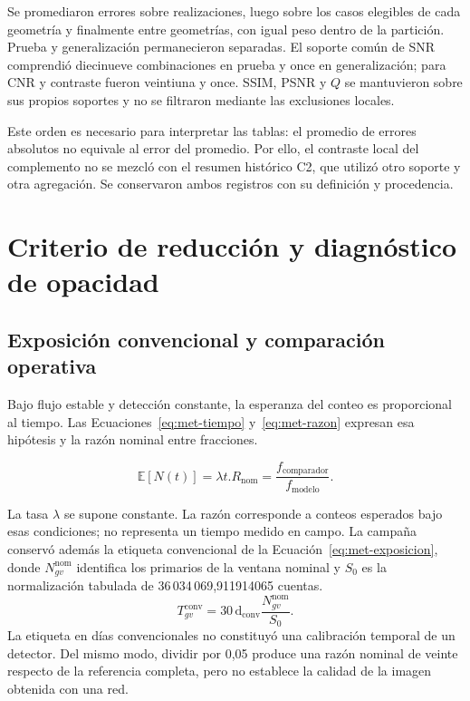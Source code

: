 Se promediaron errores sobre realizaciones, luego sobre los casos elegibles de cada geometría y finalmente entre geometrías, con igual peso dentro de la partición. Prueba y generalización permanecieron separadas. El soporte común de SNR comprendió diecinueve combinaciones en prueba y once en generalización; para CNR y contraste fueron veintiuna y once. SSIM, PSNR y $Q$ se mantuvieron sobre sus propios soportes y no se filtraron mediante las exclusiones locales.

Este orden es necesario para interpretar las tablas: el promedio de errores absolutos no equivale al error del promedio. Por ello, el contraste local del complemento no se mezcló con el resumen histórico C2, que utilizó otro soporte y otra agregación. Se conservaron ambos registros con su definición y procedencia.

\section{Criterio de reducción y diagnóstico de opacidad}\label{sec:met-factor}
\subsection{Exposición convencional y comparación operativa}
Bajo flujo estable y detección constante, la esperanza del conteo es proporcional al tiempo. Las Ecuaciones~\eqref{eq:met-tiempo} y~\eqref{eq:met-razon} expresan esa hipótesis y la razón nominal entre fracciones.
\begin{samepage}\begin{subequations}
\begin{equation}\mathbb E[N(t)]=\lambda t.\label{eq:met-tiempo}\end{equation}
\begin{equation}R_{\mathrm{nom}}=\frac{f_{\mathrm{comparador}}}{f_{\mathrm{modelo}}}.\label{eq:met-razon}\end{equation}
\end{subequations}\end{samepage}
La tasa $\lambda$ se supone constante. La razón corresponde a conteos esperados bajo esas condiciones; no representa un tiempo medido en campo. La campaña conservó además la etiqueta convencional de la Ecuación~\eqref{eq:met-exposicion}, donde $N^{\mathrm{nom}}_{gv}$ identifica los primarios de la ventana nominal y $S_0$ es la normalización tabulada de 36\,034\,069,911914065 cuentas.
\begin{equation}T^{\mathrm{conv}}_{gv}=30\,\mathrm d_{\mathrm{conv}}\frac{N^{\mathrm{nom}}_{gv}}{S_0}.\label{eq:met-exposicion}\end{equation}
La etiqueta en días convencionales no constituyó una calibración temporal de un detector. Del mismo modo, dividir por 0,05 produce una razón nominal de veinte respecto de la referencia completa, pero no establece la calidad de la imagen obtenida con una red.


